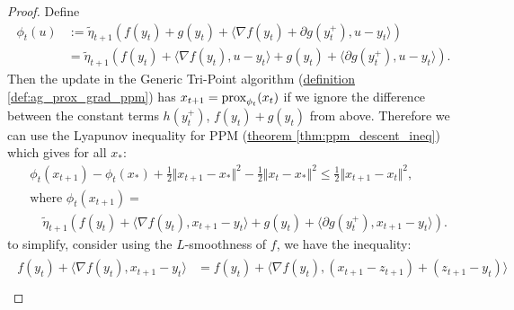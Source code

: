 \documentclass[12pt]{article}
\begin{document}
    \begin{proof}
        Define 
        \begin{align*}
            \phi_t(u) &:= 
            \tilde \eta_{t + 1} 
            \left(
                f(y_t) + g(y_t) + \langle \nabla f(y_t) + \partial g(y_t^+), u - y_t\rangle
            \right)\\
            &= 
            \tilde \eta_{t + 1} \left(
                f(y_t) + \langle \nabla f(y_t), u - y_t\rangle + 
                g(y_t) + \langle \partial g(y_t^+), u - y_t\rangle
            \right). 
        \end{align*}
        Then the update in the Generic Tri-Point algorithm 
        (\hyperref[def:ag_prox_grad_ppm]
            {definition \ref*{def:ag_prox_grad_ppm}}) 
        has $x_{t + 1} = \operatorname{prox}_{\phi_t}(x_t)$ if we ignore the difference between the constant terms $h(y_t^+)$, $f(y_t) + g(y_t)$ from above. 
        Therefore we can use the Lyapunov inequality for PPM (\hyperref[thm:ppm_descent_ineq]
            {theorem \ref*{thm:ppm_descent_ineq}})
        which gives for all $x_*$: 
        \begin{align*}
            & \phi_t(x_{t + 1}) - \phi_t(x_*) + 
            \frac{1}{2}\Vert x_{t+1} - x_*\Vert^2 - 
            \frac{1}{2}\Vert x_t - x_*\Vert^2
            \le \frac{1}{2}\Vert x_{t + 1} - x_t\Vert^2, 
            \\
            & \text{where }
            \phi_t(x_{t + 1}) =
            \\
            & \quad 
            \tilde \eta_{t + 1}
            \left(
                f(y_t) + \langle \nabla f(y_t), x_{t + 1} - y_t\rangle + 
                g(y_t) + \langle \partial g(y_t^+), x_{t + 1} - y_t\rangle
            \right). 
        \end{align*}
        to simplify, consider using the $L$-smoothness of $f$, we have the inequality: 
        \begin{align*}
            \begin{aligned}
                f(y_t) + \langle \nabla f(y_t), x_{t + 1} - y_t\rangle
                &=
                f(y_t) + \langle \nabla f(y_t), (x_{t +1} - z_{t + 1}) + (z_{t + 1} - y_t) \rangle
                \\

\end{aligned}
\end{align*}
\end{proof}
\end{document}
